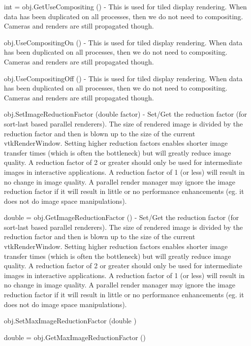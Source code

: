 \begin{DoxyItemize}
\item {\ttfamily int = obj.\-Get\-Use\-Compositing ()} -\/ This is used for tiled display rendering. When data has been duplicated on all processes, then we do not need to compositing. Cameras and renders are still propagated though.  
\item {\ttfamily obj.\-Use\-Compositing\-On ()} -\/ This is used for tiled display rendering. When data has been duplicated on all processes, then we do not need to compositing. Cameras and renders are still propagated though.  
\item {\ttfamily obj.\-Use\-Compositing\-Off ()} -\/ This is used for tiled display rendering. When data has been duplicated on all processes, then we do not need to compositing. Cameras and renders are still propagated though.  
\item {\ttfamily obj.\-Set\-Image\-Reduction\-Factor (double factor)} -\/ Set/\-Get the reduction factor (for sort-\/last based parallel renderers). The size of rendered image is divided by the reduction factor and then is blown up to the size of the current vtk\-Render\-Window. Setting higher reduction factors enables shorter image transfer times (which is often the bottleneck) but will greatly reduce image quality. A reduction factor of 2 or greater should only be used for intermediate images in interactive applications. A reduction factor of 1 (or less) will result in no change in image quality. A parallel render manager may ignore the image reduction factor if it will result in little or no performance enhancements (eg. it does not do image space manipulations).  
\item {\ttfamily double = obj.\-Get\-Image\-Reduction\-Factor ()} -\/ Set/\-Get the reduction factor (for sort-\/last based parallel renderers). The size of rendered image is divided by the reduction factor and then is blown up to the size of the current vtk\-Render\-Window. Setting higher reduction factors enables shorter image transfer times (which is often the bottleneck) but will greatly reduce image quality. A reduction factor of 2 or greater should only be used for intermediate images in interactive applications. A reduction factor of 1 (or less) will result in no change in image quality. A parallel render manager may ignore the image reduction factor if it will result in little or no performance enhancements (eg. it does not do image space manipulations).  
\item {\ttfamily obj.\-Set\-Max\-Image\-Reduction\-Factor (double )}  
\item {\ttfamily double = obj.\-Get\-Max\-Image\-Reduction\-Factor ()}  

\end{DoxyItemize}
